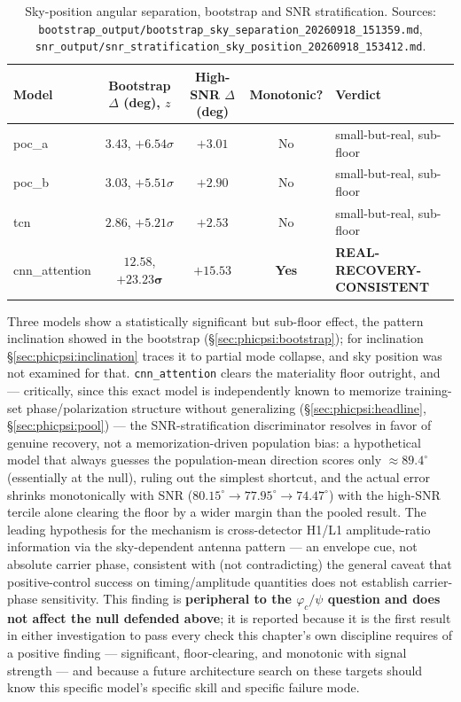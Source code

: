 \begin{table}[tbp]
    \centering
    \caption{Sky-position angular separation, bootstrap and SNR stratification. Sources: \texttt{bootstrap\_output/bootstrap\_sky\_separation\_20260918\_151359.md}, \texttt{snr\_output/snr\_stratification\_sky\_position\_20260918\_153412.md}.}
    \label{tab:phicpsi:redo:sky}
    \small
    \begin{tabular}{@{}lcccl@{}}
        \toprule
        Model & Bootstrap $\Delta$ (deg), $z$ & High-SNR $\Delta$ (deg) & Monotonic? & Verdict \\
        \midrule
        poc\_a & $3.43$, $+6.54\sigma$ & $+3.01$ & No & small-but-real, sub-floor \\
        poc\_b & $3.03$, $+5.51\sigma$ & $+2.90$ & No & small-but-real, sub-floor \\
        tcn & $2.86$, $+5.21\sigma$ & $+2.53$ & No & small-but-real, sub-floor \\
        cnn\_attention & $\mathbf{12.58}$, $\mathbf{+23.23\sigma}$ & $\mathbf{+15.53}$ & \textbf{Yes} & \textbf{REAL-RECOVERY-CONSISTENT} \\
        \bottomrule
    \end{tabular}
\end{table}

Three models show a statistically significant but sub-floor effect, the pattern inclination showed in the bootstrap (\S\ref{sec:phicpsi:bootstrap}); for inclination \S\ref{sec:phicpsi:inclination} traces it to partial mode collapse, and sky position was not examined for that.
\texttt{cnn\_attention} clears the materiality floor outright, and --- critically, since this exact model is independently known to memorize training-set phase/polarization structure without generalizing (\S\ref{sec:phicpsi:headline}, \S\ref{sec:phicpsi:pool}) --- the SNR-stratification discriminator resolves in favor of genuine recovery, not a memorization-driven population bias: a hypothetical model that always guesses the population-mean direction scores only $\approx 89.4^\circ$ (essentially at the null), ruling out the simplest shortcut, and the actual error shrinks monotonically with SNR ($80.15^\circ \to 77.95^\circ \to 74.47^\circ$) with the high-SNR tercile alone clearing the floor by a wider margin than the pooled result.
The leading hypothesis for the mechanism is cross-detector H1/L1 amplitude-ratio information via the sky-dependent antenna pattern --- an envelope cue, not absolute carrier phase, consistent with (not contradicting) the general caveat that positive-control success on timing/amplitude quantities does not establish carrier-phase sensitivity.
This finding is \textbf{peripheral to the $\varphi_c/\psi$ question and does not affect the null defended above}; it is reported because it is the first result in either investigation to pass every check this chapter's own discipline requires of a positive finding --- significant, floor-clearing, and monotonic with signal strength --- and because a future architecture search on these targets should know this specific model's specific skill and specific failure mode.


